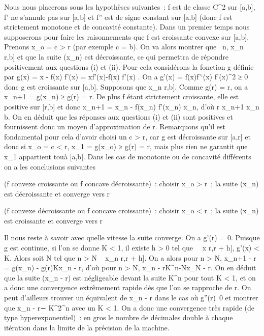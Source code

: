 \documentclass[]{article}
\begin{document}
Nous nous placerons sous les hypothèses suivantes~: f est de classe
C^2 sur {[}a,b{]}, f' ne s'annule pas sur {[}a,b{]} et f''
est de signe constant sur {[}a,b{]} (donc f est strictement monotone et
de concavité constante). Dans un premier temps nous supposerons pour
faire les raisonnements que f est croissante convexe sur {[}a,b{]}.
Prenons x\_o = c \textgreater{} r (par exemple c = b). On va
alors montrer que \forall~n, x\_n~ \in {[}r,b{]}
et que la suite (x\_n) est décroissante, ce qui permettra de
répondre positivement aux questions (i) et (ii). Pour cela considérons
la fonction g définie par g(x) = x - f(x) \over f'(x)
= xf'(x)-f(x) \over f'(x) . On a g'(x) = f(x)f'`(x)
\over f'(x)^2 ≥ 0 donc g est croissante sur
{[}a,b{]}. Supposons que x\_n \in {[}r,b{]}. Comme g(r) = r, on a
x\_n+1 = g(x\_n) ≥ g(r) = r. De plus f étant strictement
croissante, elle est positive sur {[}r,b{]} et donc x\_n+1 =
x\_n - f(x\_n) \over f'(x\_n)
\leq x\_n, d'où r \leq x\_n+1 \leq x\_n \leq b. On en déduit
que les réponses aux questions (i) et (ii) sont positives et fournissent
donc un moyen d'approximation de r. Remarquons qu'il est fondamental
pour cela d'avoir choisi un c \textgreater{} r, car g est décroissante
sur {[}a,r{]} et donc si x\_o = c \textless{} r, x\_1 =
g(x\_o) ≥ g(r) = r, mais plus rien ne garantit que x\_1
appartient tou\jmathours à {[}a,b{]}. Dans les cas de monotonie ou de
concavité différents on a les conclusions suivantes

(f convexe croissante ou f concave décroissante)~: choisir x\_o
\textgreater{} r~; la suite (x\_n) est décroissante et converge
vers r

(f convexe décroissante ou f concave croissante)~: choisir x\_o
\textless{} r~; la suite (x\_n) est croissante et converge vers
r

Il nous reste à savoir avec quelle vitesse la suite converge. On a g'(r)
= 0. Puisque g est continue, si l'on se donne K \textless{} 1, il existe
h \textgreater{} 0 tel que \forall~~x \in {[}r,r + h{]},
\textbar{}g'(x)\textbar{} \textless{} K. Alors soit N tel que n
\textgreater{} N \rigtharrow~ x\_n \in {[}r,r + h{]}. On a alors pour n
\textgreater{} N, \textbar{}x\_n+1 - r\textbar{} =
\textbar{}g(x\_n) - g(r)\textbar{}\leq K\textbar{}x\_n -
r\textbar{}, d'où pour n \textgreater{} N, \textbar{}x\_n -
r\textbar{}\leq K^n-N\textbar{}x\_N - r\textbar{}. On en
déduit que la suite (x\_n - r) est négligeable devant la suite
K^n pour tout K \textless{} 1, et on a donc une convergence
extrêmement rapide dès que l'on se rapproche de r. On peut d'ailleurs
trouver un équivalent de \textbar{}x\_n - r\textbar{} dans le
cas où g''(r)\neq~0 et montrer que
\textbar{}x\_n - r\textbar{}∼ K^2^n  avec
un K \textless{} 1. On a donc une convergence très rapide (de type
hyperexponentiel)~: en gros le nombre de décimales double à chaque
itération dans la limite de la précision de la machine.
\end{document}
